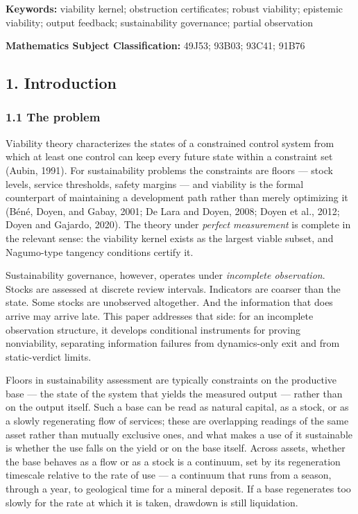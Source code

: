 \documentclass[10pt,twocolumn]{article}
\theoremstyle{definition}
\begin{document}
\begin{abstract}
The calculus is positioned against barrier certificates and estimation
tubes, and its monitoring and institutional consequences ---
observation timing, coarseness, aggregation, and bias --- are drawn.

\end{abstract}

\textbf{Keywords:} viability kernel; obstruction certificates; robust
viability; epistemic viability; output feedback; sustainability
governance; partial observation

\textbf{Mathematics Subject Classification:} 49J53; 93B03; 93C41; 91B76

\subsection{1. Introduction}\label{calc-introduction}

\subsubsection{1.1 The problem}\label{calc-the-problem}

Viability theory characterizes the states of a constrained control system from which at least one control can keep every future state within a constraint set (Aubin, 1991). For sustainability problems the constraints are floors --- stock levels, service thresholds, safety margins --- and viability is the formal counterpart of maintaining a development path rather than merely optimizing it (B\'en\'e, Doyen, and Gabay, 2001; De Lara and Doyen, 2008;
Doyen et al., 2012; Doyen and Gajardo, 2020). The theory under
\emph{perfect measurement} is complete in the relevant sense: the
viability kernel exists as the largest viable subset, and Nagumo-type
tangency conditions certify it.

Sustainability governance, however, operates under \emph{incomplete
observation}. Stocks are assessed at discrete review intervals.
Indicators are coarser than the state. Some stocks are unobserved
altogether. And the information that does arrive may arrive late. This paper addresses that side: for an incomplete observation structure, it develops conditional instruments for proving nonviability, separating information failures from dynamics-only exit and from static-verdict limits.

Floors in sustainability assessment are typically constraints on the
productive base --- the state of the system that yields the measured
output --- rather than on the output itself. Such a base can be read as
natural capital, as a stock, or as a slowly regenerating flow of
services; these are overlapping readings of the same asset rather than
mutually exclusive ones, and what makes a use of it sustainable is
whether the use falls on the yield or on the base itself. Across
assets, whether the base behaves as a flow or as a stock is a
continuum, set by its regeneration timescale relative to the rate of
use --- a continuum that runs from a season, through a year, to
geological time for a mineral deposit. If a base regenerates too
slowly for the rate at which it is taken, drawdown is still
liquidation.
\end{document}
